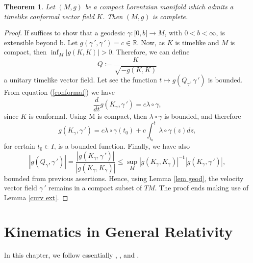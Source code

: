 \documentclass[11pt]{book}
\newtheorem{theor}[defi]{Theorem}
\def\R{\mathbb R}
\begin{document}
\begin{theor}
	Let $(M,g)$ be a compact Lorentzian manifold which admits a timelike conformal vector field $K$. Then $(M,g)$ is complete.
\end{theor}
\begin{proof}
	If suffices to show that a geodesic $\gamma: [0,b[ \to M$, with $0 < b <\infty$, is extensible beyond b. Let $g(\gamma\,', \gamma\,')=c\in \R$. Now, as $K$ is timelike and $M$ is compact, then $\inf_M |g(K,K)| > 0$. Therefore, we can define $$Q:=\dfrac{K}{\sqrt{-g(K,K)}}$$ a unitary timelike vector field. Let see the function $t\mapsto g(Q_\gamma,\gamma\,')$ is bounded. From equation (\ref{conformal}) we have
	\[
	\frac{d}{dt} g(K_\gamma, \gamma\,') = c \lambda \circ \gamma,
	\]
	since $K$ is conformal. Using M is compact, then $\lambda \circ \gamma$ is bounded, and therefore 
	\[
	g(K_\gamma, \gamma\,') = c \lambda \circ \gamma(t_0) + c \int_{t_0}^t \lambda \circ \gamma(z) dz,
	\]
	for certain $t_0\in I$, is a bounded function. Finally, we have also
	\[
	\left|g(Q_\gamma, \gamma\,')\right| = \frac{\left|g(K_\gamma, \gamma\,')\right|}{|g(K_\gamma,K_\gamma)|} \le \sup_M |g(K_\gamma,K_\gamma)|^{-1} \left|g(K_\gamma, \gamma\,')\right|,
	\]
	bounded from previous assertions.
	Hence, using Lemma \ref{lem geod}, the velocity vector field $\gamma\,'$ remains in a compact subset of $TM$. The proof ends making use of Lemma \ref{curv ext}.
\end{proof}

\chapter{Kinematics in General Relativity}\label{Chapter3}
In this chapter, we follow essentially \cite{UAM}, \cite{UDM}, \cite{UCM} and \cite{GyR}.
\end{document}
